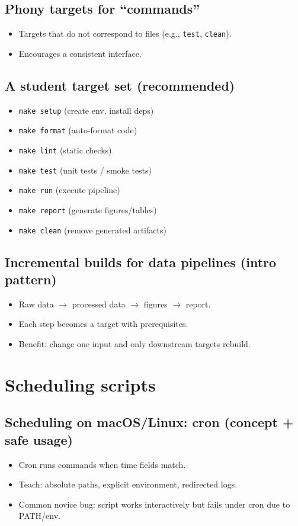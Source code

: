 \subsection{Phony targets for ``commands''}
\begin{itemize}
\item Targets that do not correspond to files (e.g., \texttt{test}, \texttt{clean}).
\item Encourages a consistent interface.
\end{itemize}

\subsection{A student target set (recommended)}
\begin{itemize}
\item \texttt{make setup} (create env, install deps)
\item \texttt{make format} (auto-format code)
\item \texttt{make lint} (static checks)
\item \texttt{make test} (unit tests / smoke tests)
\item \texttt{make run} (execute pipeline)
\item \texttt{make report} (generate figures/tables)
\item \texttt{make clean} (remove generated artifacts)
\end{itemize}

\subsection{Incremental builds for data pipelines (intro pattern)}
\begin{itemize}
\item Raw data $\rightarrow$ processed data $\rightarrow$ figures $\rightarrow$ report.
\item Each step becomes a target with prerequisites.
\item Benefit: change one input and only downstream targets rebuild.
\end{itemize}

\section{Scheduling scripts}
\subsection{Scheduling on macOS/Linux: cron (concept + safe usage)}
\begin{itemize}
\item Cron runs commands when time fields match.
\item Teach: absolute paths, explicit environment, redirected logs.
\item Common novice bug: script works interactively but fails under cron due to PATH/env.
\end{itemize}

